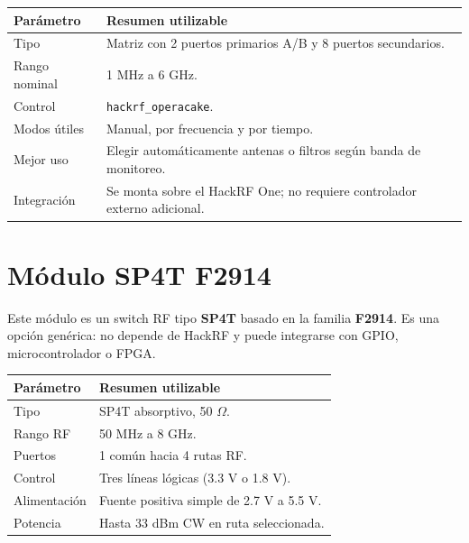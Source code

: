 \documentclass[11pt]{article}
\begin{document}
\begin{table}[h]
    \centering
    \small
    \begin{tabular}{p{}p{}}
        \toprule
        \textbf{Parámetro} & \textbf{Resumen utilizable} \\
        \midrule
        Tipo & Matriz con 2 puertos primarios A/B y 8 puertos secundarios. \\
        Rango nominal & 1 MHz a 6 GHz. \\
        Control & \texttt{hackrf\_operacake}. \\
        Modos útiles & Manual, por frecuencia y por tiempo. \\
        Mejor uso & Elegir automáticamente antenas o filtros según banda de monitoreo. \\
        Integración & Se monta sobre el HackRF One; no requiere controlador externo adicional. \\
        \bottomrule
    \end{tabular}
\end{table}

\section{Módulo SP4T F2914}

Este módulo es un switch RF tipo \textbf{SP4T} basado en la familia \textbf{F2914}. Es una opción genérica: no depende de HackRF y puede integrarse con GPIO, microcontrolador o FPGA.

\begin{table}[h]
    \centering
    \small
    \begin{tabular}{p{}p{}}
        \toprule
        \textbf{Parámetro} & \textbf{Resumen utilizable} \\
        \midrule
        Tipo & SP4T absorptivo, 50 $\Omega$. \\
        Rango RF & 50 MHz a 8 GHz. \\
        Puertos & 1 común hacia 4 rutas RF. \\
        Control & Tres líneas lógicas (3.3 V o 1.8 V). \\
        Alimentación & Fuente positiva simple de 2.7 V a 5.5 V. \\
        Potencia & Hasta 33 dBm CW en ruta seleccionada. \\
        \bottomrule
    \end{tabular}
\end{table}
\end{document}
